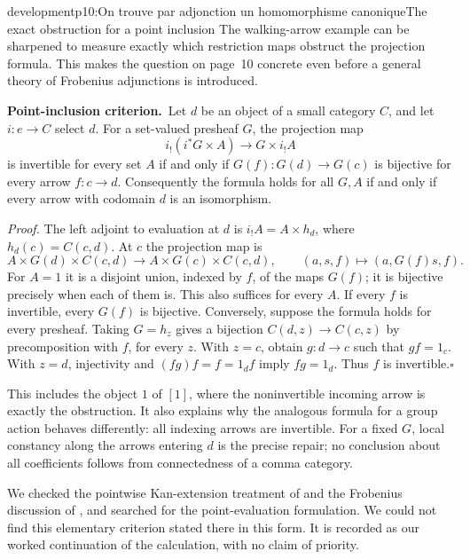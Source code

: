 \begin{dcomment}{development}{p10:On trouve par adjonction un homomorphisme canonique}{The exact obstruction for a point inclusion}
The walking-arrow example can be sharpened to measure exactly which restriction maps obstruct the projection formula. This makes the question on page~10 concrete even before a general theory of Frobenius adjunctions is introduced.

\textbf{Point-inclusion criterion.}\ours\
Let $d$ be an object of a small category $C$, and let $i:e\to C$ select $d$. For a set-valued presheaf $G$, the projection map
\[
 i_!(i^*G\times A)\longrightarrow G\times i_!A
\]
is invertible for every set $A$ if and only if $G(f):G(d)\to G(c)$ is bijective for every arrow $f:c\to d$. Consequently the formula holds for all $G,A$ if and only if every arrow with codomain $d$ is an isomorphism.

\textit{Proof.}
The left adjoint to evaluation at $d$ is $i_!A=A\times h_d$, where $h_d(c)=C(c,d)$. At $c$ the projection map is
\[
 A\times G(d)\times C(c,d)\longrightarrow
 A\times G(c)\times C(c,d),\qquad
 (a,s,f)\longmapsto(a,G(f)s,f).
\]
For $A=1$ it is a disjoint union, indexed by $f$, of the maps $G(f)$; it is bijective precisely when each of them is. This also suffices for every $A$. If every $f$ is invertible, every $G(f)$ is bijective. Conversely, suppose the formula holds for every presheaf. Taking $G=h_z$ gives a bijection $C(d,z)\to C(c,z)$ by precomposition with $f$, for every $z$. With $z=c$, obtain $g:d\to c$ such that $gf=1_c$. With $z=d$, injectivity and $(fg)f=f=1_df$ imply $fg=1_d$. Thus $f$ is invertible.\hfill$\square$

This includes the object $1$ of $[1]$, where the noninvertible incoming arrow is exactly the obstruction. It also explains why the analogous formula for a group action behaves differently: all indexing arrows are invertible. For a fixed $G$, local constancy along the arrows entering $d$ is the precise repair; no conclusion about all coefficients follows from connectedness of a comma category.

We checked the pointwise Kan-extension treatment of \citet[\S6.2]{Riehl2016} and the Frobenius discussion of \citet[\S1]{GarnerStreicher2021}, and searched for the point-evaluation formulation. We could not find this elementary criterion stated there in this form. It is recorded as our worked continuation of the calculation, with no claim of priority.
\end{dcomment}

